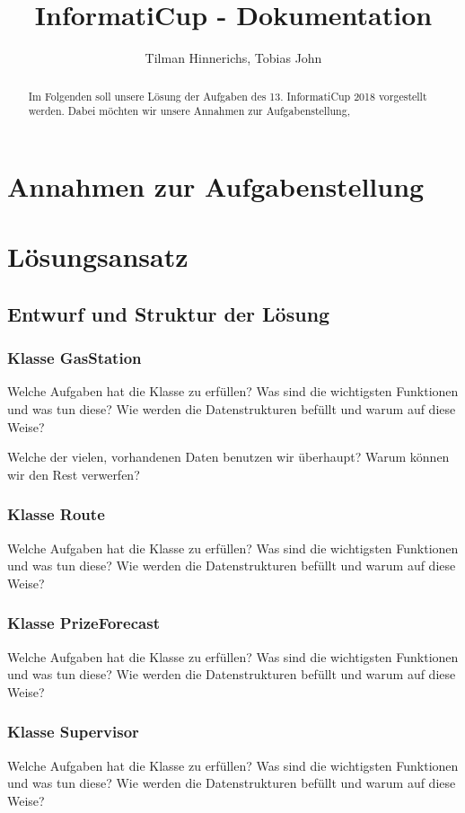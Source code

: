 \documentclass[11pt]{article}
\title{InformatiCup - Dokumentation}
\author{Tilman Hinnerichs, Tobias John}
\begin{document}
\maketitle

\begin{abstract}
	Im Folgenden soll unsere Lösung der Aufgaben des 13. InformatiCup 2018 vorgestellt werden. Dabei möchten wir unsere Annahmen zur Aufgabenstellung, 
\end{abstract}

\section{Annahmen zur Aufgabenstellung}
\section{Lösungsansatz}
\subsection{Entwurf und Struktur der Lösung}
\subsubsection{Klasse GasStation}
	Welche Aufgaben hat die Klasse zu erfüllen? Was sind die wichtigsten Funktionen und was tun diese? Wie werden die Datenstrukturen befüllt und warum auf diese Weise?
	
	Welche der vielen, vorhandenen Daten benutzen wir überhaupt? Warum können wir den Rest verwerfen?
\subsubsection{Klasse Route}
	Welche Aufgaben hat die Klasse zu erfüllen? Was sind die wichtigsten Funktionen und was tun diese? Wie werden die Datenstrukturen befüllt und warum auf diese Weise?
\subsubsection{Klasse PrizeForecast}
	Welche Aufgaben hat die Klasse zu erfüllen? Was sind die wichtigsten Funktionen und was tun diese? Wie werden die Datenstrukturen befüllt und warum auf diese Weise?
\subsubsection{Klasse Supervisor}
	Welche Aufgaben hat die Klasse zu erfüllen? Was sind die wichtigsten Funktionen und was tun diese? Wie werden die Datenstrukturen befüllt und warum auf diese Weise?
\end{document}
